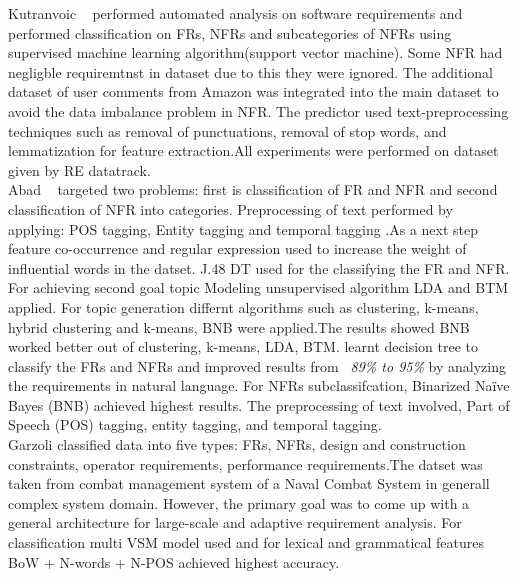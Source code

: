 	Kutranvoic \etal ~ \cite {Kurtanovic:2017}performed automated analysis on
software requirements and performed classification on FRs, NFRs and
subcategories of NFRs using supervised machine learning algorithm(support vector
machine). Some NFR had negligble requiremtnst in dataset due to this they were
ignored. The additional dataset of user comments from Amazon was integrated into
the main dataset to avoid the data imbalance problem in NFR. The predictor used
text-preprocessing techniques such as removal of punctuations, removal of stop
words, and lemmatization for feature extraction.All experiments were performed
on dataset given by RE datatrack.\\

 	Abad \etal ~ \cite{Abad:2017} targeted two problems: first is classification of
 FR and NFR and second classification of NFR into categories. Preprocessing of
 text performed by applying: POS tagging, Entity tagging and temporal tagging
 .As a next step feature co-occurrence and regular expression used to increase
 the weight of influential words in the datset. 
J.48 DT used for the classifying the FR and NFR. For achieving second goal topic Modeling unsupervised algorithm
 LDA and BTM applied. For topic generation differnt algorithms such as
 clustering, k-means, hybrid clustering and k-means, BNB were applied.The
 results showed BNB worked better out of clustering, k-means, LDA, BTM.
learnt decision tree to classify the FRs and NFRs and improved results from 
\emph{~89\% to 95\%} by analyzing the requirements in natural language. For NFRs
subclassifcation, Binarized Naïve Bayes (BNB) achieved highest results. The
preprocessing of text involved, Part of Speech (POS) tagging, entity tagging,
and temporal tagging.\\

	Garzoli \cite {Garzoli:2013} classified data into five
types: FRs, NFRs, design and construction constraints, operator requirements,
performance requirements.The datset was taken from combat management system of a
Naval Combat System in generall complex system domain. However, the primary goal
was to come up with a general architecture for large-scale and adaptive
requirement analysis. For classification multi VSM model used and for lexical
and grammatical features BoW + N-words + N-POS achieved highest accuracy.\\

